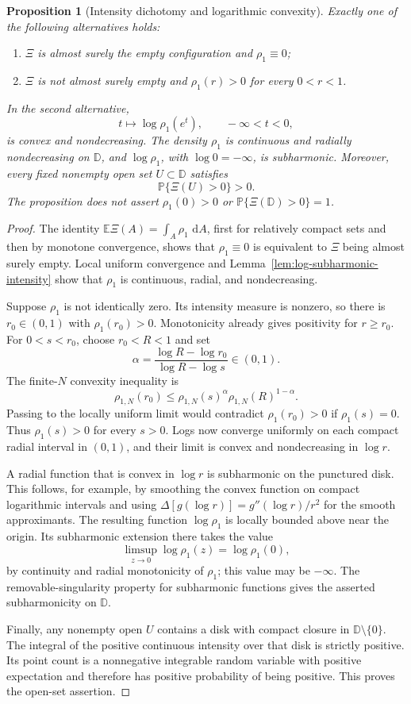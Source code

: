 \documentclass[11pt,a4paper]{article}
\numberwithin{equation}{section}
\newtheorem{proposition}[theorem]{Proposition}
\theoremstyle{definition}
\theoremstyle{remark}
\newcommand{\D}{\mathbb D}
\newcommand{\E}{\mathbb E}
\newcommand{\Pbb}{\mathbb P}
\newcommand{\dd}{\,\mathrm d}
\begin{document}
\begin{proposition}[Intensity dichotomy and logarithmic convexity]
\label{prop:intensity-dichotomy}
Exactly one of the following alternatives holds:
\begin{enumerate}
 \item $\Xi$ is almost surely the empty configuration and
       $\rho_1\equiv0$;
 \item $\Xi$ is not almost surely empty and
       $\rho_1(r)>0$ for every $0<r<1$.
\end{enumerate}
In the second alternative,
\[
 t\longmapsto\log\rho_1(e^t),\qquad -\infty<t<0,
\]
is convex and nondecreasing. The density $\rho_1$ is continuous and
radially nondecreasing on $\D$, and $\log\rho_1$, with
$\log0=-\infty$, is subharmonic. Moreover, every fixed nonempty open
set $U\subset\D$ satisfies
\[
 \Pbb\{\Xi(U)>0\}>0.
\]
The proposition does not assert $\rho_1(0)>0$ or
$\Pbb\{\Xi(\D)>0\}=1$.
\end{proposition}

\begin{proof}
The identity $\E\Xi(A)=\int_A\rho_1\,\dd A$, first for relatively
compact sets and then by monotone convergence, shows that
$\rho_1\equiv0$ is equivalent to $\Xi$ being almost surely empty.
Local uniform convergence and Lemma~\ref{lem:log-subharmonic-intensity}
show that $\rho_1$ is continuous, radial, and nondecreasing.

Suppose $\rho_1$ is not identically zero. Its intensity measure is
nonzero, so there is $r_0\in(0,1)$ with $\rho_1(r_0)>0$.
Monotonicity already gives positivity for $r\geq r_0$.
For $0<s<r_0$, choose $r_0<R<1$ and set
\[
 \alpha=\frac{\log R-\log r_0}{\log R-\log s}\in(0,1).
\]
The finite-$N$ convexity inequality is
\[
 \rho_{1,N}(r_0)
 \leq \rho_{1,N}(s)^\alpha
       \rho_{1,N}(R)^{1-\alpha}.
\]
Passing to the locally uniform limit would contradict
$\rho_1(r_0)>0$ if $\rho_1(s)=0$. Thus $\rho_1(s)>0$ for every
$s>0$. Logs now converge uniformly on each compact radial interval in
$(0,1)$, and their limit is convex and nondecreasing in $\log r$.

A radial function that is convex in $\log r$ is subharmonic on the
punctured disk. This follows, for example, by smoothing the convex
function on compact logarithmic intervals and using
$\Delta[g(\log r)]=g''(\log r)/r^2$ for the smooth approximants.
The resulting function $\log\rho_1$ is locally bounded above near
the origin. Its subharmonic extension there takes the value
\[
 \limsup_{z\to0}\log\rho_1(z)=\log\rho_1(0),
\]
by continuity and radial monotonicity of $\rho_1$; this value may be
$-\infty$. The removable-singularity property for subharmonic
functions gives the asserted subharmonicity on $\D$.

Finally, any nonempty open $U$ contains a disk with compact closure
in $\D\setminus\{0\}$. The integral of the positive continuous
intensity over that disk is strictly positive. Its point count is a
nonnegative integrable random variable with positive expectation and
therefore has positive probability of being positive. This proves the
open-set assertion.
\end{proof}
\end{document}
